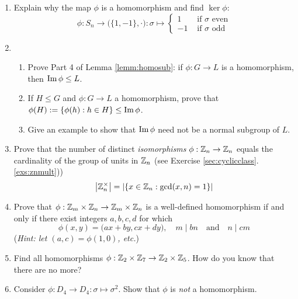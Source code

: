 \begin{exercises}{}{}
\begin{enumerate}
		
		
		
		\item Explain why the map $\phi$ is a homomorphism and find $\ker\phi$:
		\[
			\phi:S_n\to \bigl(\{1,-1\},\cdot\bigr):\sigma \mapsto 
			\begin{cases}
	  		1&\text{ if $\sigma$ even}\\
	  		-1&\text{ if $\sigma$ odd}
			\end{cases}
		\]
	
	
		\item\begin{enumerate}
		  \item Prove Part 4 of Lemma \ref{lemm:homosub}: if $\phi:G\to L$ is a homomorphism, then $\operatorname{Im}\phi\le L$.
		 	\item If $H\le G$ and $\phi:G\to L$ a homomorphism, prove that $\phi(H):=\{\phi(h):h\in H\}\le\operatorname{Im}\phi$.
		  \item Give an example to show that $\operatorname{Im}\phi$ need not be a normal subgroup of $L$.
		\end{enumerate}
	
		
		\item\label{exs:totient} Prove that the number of distinct \emph{isomorphisms} $\phi:\mathbb{Z}_n\to\mathbb{Z}_n$ equals the cardinality of the group of units in $\mathbb{Z}_n$ (see Exercise \ref*{sec:cyclicclass}.\ref{exs:znmult}))
		\[
			\left| \mathbb{Z}_n^\times\right|=\left| \{x\in\mathbb{Z}_n:\gcd(x,n)=1\}\right|
		\]
			
			  
	  \item Prove that $\phi:\mathbb{Z}_m\times\mathbb{Z}_n\to\mathbb{Z}_m\times\mathbb{Z}_n$ is a well-defined homomorphism if and only if there exist integers $a,b,c,d$ for which
	  \[
	  	\phi(x,y)=\bigl(ax+by,cx+dy\bigr),\quad 
	  	m\mid bn\quad
	  	\text{and}\quad n\mid cm
	  \]
	  (\emph{Hint: let $(a,c)=\phi(1,0)$, etc.})
	  
	
		\item Find all homomorphisms $\phi:\mathbb{Z}_2\times\mathbb{Z}_7\to\mathbb{Z}_2\times\mathbb{Z}_5$. How do you know that there are no more?
		
		  
	  \item Consider $\phi:D_4\to D_4:\sigma\mapsto \sigma^2$. Show that $\phi$ is \emph{not} a homomorphism.
		
	\end{enumerate}
\end{exercises}

